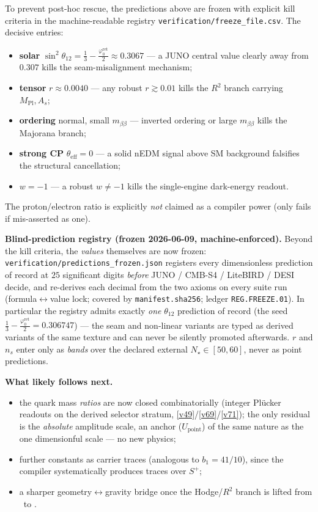 \documentclass[11pt,a4paper]{article}
\newcommand{\phiz}{\varphi_0^{\mathrm{ret}}}
\newcommand{\Mpl}{M_{\mathrm{Pl}}}
\begin{document}
\begin{winboxnb}
To prevent post-hoc rescue, the predictions above are frozen with explicit kill criteria in the
machine-readable registry \texttt{verification/freeze\_file.csv}. The decisive entries:
\begin{itemize}[leftmargin=1.4em,itemsep=1pt]
\item \textbf{solar} $\sin^2\theta_{12}=\tfrac13-\tfrac{\phiz}{2}\approx0.3067$ --- a JUNO central value clearly
  away from $0.307$ kills the seam-misalignment mechanism;
\item \textbf{tensor} $r\approx0.0040$ --- any robust $r\gtrsim0.01$ kills the $R^2$ branch carrying $\Mpl,A_s$;
\item \textbf{ordering} normal, small $m_{\beta\beta}$ --- inverted ordering or large $m_{\beta\beta}$ kills the
  Majorana branch;
\item \textbf{strong CP} $\theta_{\mathrm{eff}}=0$ --- a solid nEDM signal above SM background falsifies the
  structural cancellation;
\item \textbf{$w=-1$} --- a robust $w\neq-1$ kills the single-engine dark-energy readout.
\end{itemize}
The proton/electron ratio is explicitly \emph{not} claimed as a compiler power (only fails if mis-asserted as one).
\smallskip

\noindent\textbf{Blind-prediction registry (frozen 2026-06-09, machine-enforced).} Beyond the kill criteria,
the \emph{values} themselves are now frozen: \texttt{verification/predictions\_frozen.json} registers every
dimensionless prediction of record at $25$ significant digits \emph{before} JUNO / CMB-S4 / LiteBIRD / DESI
decide, and  re-derives each decimal from the two axioms on every suite run
(formula$\leftrightarrow$value lock; covered by \texttt{manifest.sha256}; ledger \texttt{REG.FREEZE.01}).
In particular the registry admits exactly \emph{one} $\theta_{12}$ prediction of record (the seed
$\tfrac13-\tfrac{\phiz}2=0.306747$) --- the seam and non-linear variants are typed as derived variants of the
same texture and can never be silently promoted afterwards. $r$ and $n_s$ enter only as \emph{bands} over the
declared external $N_\star\in[50,60]$, never as point predictions.
\end{winboxnb}

\noindent\textbf{What likely follows next.}
\begin{itemize}[leftmargin=1.4em]
\item the quark mass \emph{ratios} are now closed combinatorially (integer Pl\"ucker readouts on the derived
      selector stratum, \vref{v49}/\vref{v69}/\vref{v71}); the only residual is the \emph{absolute} amplitude scale, an anchor
      ($U_{\mathrm{point}}$) of the same nature as the one dimensionful scale --- no new physics;
\item further constants as carrier traces (analogous to $b_1=41/10$), since the compiler systematically
      produces traces over $S^+$;
\item a sharper geometry$\leftrightarrow$gravity bridge once the Hodge/$R^2$ branch is lifted from
      \mC\ to \mE.
\end{itemize}
\end{document}
